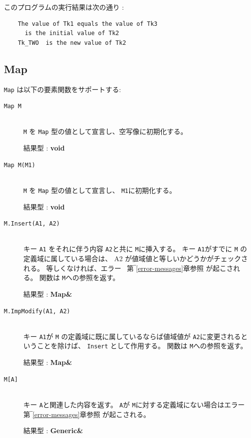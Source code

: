 \documentclass[\pformat,12pt]{jarticle}
\begin{document}
\noindent このプログラムの実行結果は次の通り :

\begin{verbatim}
    The value of Tk1 equals the value of Tk3
      is the initial value of Tk2
    Tk_TWO  is the new value of Tk2
\end{verbatim}




\subsection{Map}
{\tt Map} は以下の要素関数をサポートする:

\vspace{0.5cm}

\begin{description}
\item[{\tt Map M}] \mbox{}\\
     {\tt M} を {\tt Map} 型の値として宣言し、空写像に初期化する。

     結果型 : {\bf void}

\item[{\tt Map M(M1)}] \mbox{}\\
      {\tt M} を {\tt Map} 型の値として宣言し、 {\tt M1}に初期化する。

     結果型 : {\bf void}

\item[{\tt M.Insert(A1, A2)}] \mbox{}\\
キー {\tt A1} をそれに伴う内容 {\tt A2}と共に {\tt M}に挿入する。 
キー {\tt A1}がすでに {\tt M} の定義域に属している場合は、 A2 が値域値と等しいかどうかがチェックされる。
  等しくなければ、エラー \ 第‾\ref{error-messages}章参照 が起こされる。 
  関数は {\tt M}への参照を返す。

     結果型 : {\bf Map\&}

\item[{\tt M.ImpModify(A1, A2)}] \mbox{}\\
     キー {\tt A1}が {\tt M} の定義域に既に属しているならば値域値が {\tt A2}に変更されるということを除けば、 {\tt Insert} として作用する。 
関数は {\tt M}への参照を返す。 

     結果型 : {\bf Map\&}
 
\item[{\tt M[A]}] \mbox{}\\
     キー {\tt A}と関連した内容を返す。
 {\tt A}が {\tt M}に対する定義域にない場合はエラー 第‾\ref{error-messages}章参照 が起こされる。

     結果型 : {\bf Generic\&}


\end{description}
\end{document}
